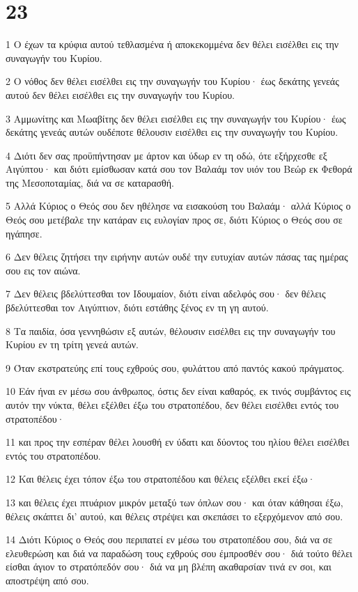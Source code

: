 \chapter{23}

\par 1 Ο έχων τα κρύφια αυτού τεθλασμένα ή αποκεκομμένα δεν θέλει εισέλθει εις την συναγωγήν του Κυρίου.
\par 2 Ο νόθος δεν θέλει εισέλθει εις την συναγωγήν του Κυρίου· έως δεκάτης γενεάς αυτού δεν θέλει εισέλθει εις την συναγωγήν του Κυρίου.
\par 3 Αμμωνίτης και Μωαβίτης δεν θέλει εισέλθει εις την συναγωγήν του Κυρίου· έως δεκάτης γενεάς αυτών ουδέποτε θέλουσιν εισέλθει εις την συναγωγήν του Κυρίου.
\par 4 Διότι δεν σας προϋπήντησαν με άρτον και ύδωρ εν τη οδώ, ότε εξήρχεσθε εξ Αιγύπτου· και διότι εμίσθωσαν κατά σου τον Βαλαάμ τον υιόν του Βεώρ εκ Φεθορά της Μεσοποταμίας, διά να σε καταρασθή.
\par 5 Αλλά Κύριος ο Θεός σου δεν ηθέλησε να εισακούση του Βαλαάμ· αλλά Κύριος ο Θεός σου μετέβαλε την κατάραν εις ευλογίαν προς σε, διότι Κύριος ο Θεός σου σε ηγάπησε.
\par 6 Δεν θέλεις ζητήσει την ειρήνην αυτών ουδέ την ευτυχίαν αυτών πάσας τας ημέρας σου εις τον αιώνα.
\par 7 Δεν θέλεις βδελύττεσθαι τον Ιδουμαίον, διότι είναι αδελφός σου· δεν θέλεις βδελύττεσθαι τον Αιγύπτιον, διότι εστάθης ξένος εν τη γη αυτού.
\par 8 Τα παιδία, όσα γεννηθώσιν εξ αυτών, θέλουσιν εισέλθει εις την συναγωγήν του Κυρίου εν τη τρίτη γενεά αυτών.
\par 9 Όταν εκστρατεύης επί τους εχθρούς σου, φυλάττου από παντός κακού πράγματος.
\par 10 Εάν ήναι εν μέσω σου άνθρωπος, όστις δεν είναι καθαρός, εκ τινός συμβάντος εις αυτόν την νύκτα, θέλει εξέλθει έξω του στρατοπέδου, δεν θέλει εισέλθει εντός του στρατοπέδου·
\par 11 και προς την εσπέραν θέλει λουσθή εν ύδατι και δύοντος του ηλίου θέλει εισέλθει εντός του στρατοπέδου.
\par 12 Και θέλεις έχει τόπον έξω του στρατοπέδου και θέλεις εξέλθει εκεί έξω·
\par 13 και θέλεις έχει πτυάριον μικρόν μεταξύ των όπλων σου· και όταν κάθησαι έξω, θέλεις σκάπτει δι' αυτού, και θέλεις στρέψει και σκεπάσει το εξερχόμενον από σου.
\par 14 Διότι Κύριος ο Θεός σου περιπατεί εν μέσω του στρατοπέδου σου, διά να σε ελευθερώση και διά να παραδώση τους εχθρούς σου έμπροσθέν σου· διά τούτο θέλει είσθαι άγιον το στρατόπεδόν σου· διά να μη βλέπη ακαθαρσίαν τινά εν σοι, και αποστρέψη από σου.

